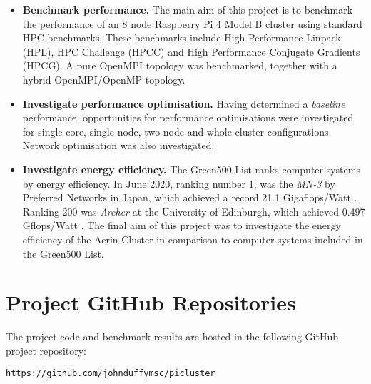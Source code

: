 \begin{itemize}
\item \textbf{Benchmark performance.} The main aim of this project is to benchmark the performance of an 8 node Raspberry Pi 4 Model B cluster using standard HPC benchmarks. These benchmarks include High Performance Linpack (HPL), HPC Challenge (HPCC) and High Performance Conjugate Gradients (HPCG). A pure OpenMPI topology was benchmarked, together with a hybrid OpenMPI/OpenMP topology.

%
%

\item \textbf{Investigate performance optimisation.} Having determined a \emph{baseline} performance, opportunities for performance optimisations were investigated for single core, single node, two node and whole cluster configurations. Network optimisation was also investigated.

%
%

\item \textbf{Investigate energy efficiency.} The Green500 List ranks computer systems by energy efficiency. In June 2020, ranking number 1, was the \emph{MN-3} by Preferred Networks in Japan, which achieved a record 21.1 Gigaflops/Watt \cite{green500}. Ranking 200 was \emph{Archer} at the University of Edinburgh, which achieved 0.497 Gflops/Watt \cite{green500}. The final aim of this project was to investigate the energy efficiency of the Aerin Cluster in comparison to computer systems included in the Green500 List. 
\end{itemize}


%
%
\section{Project GitHub Repositories}

The project code and benchmark results are hosted in the following GitHub project repository:

\begin{verbatim}
https://github.com/johnduffymsc/picluster
\end{verbatim}

